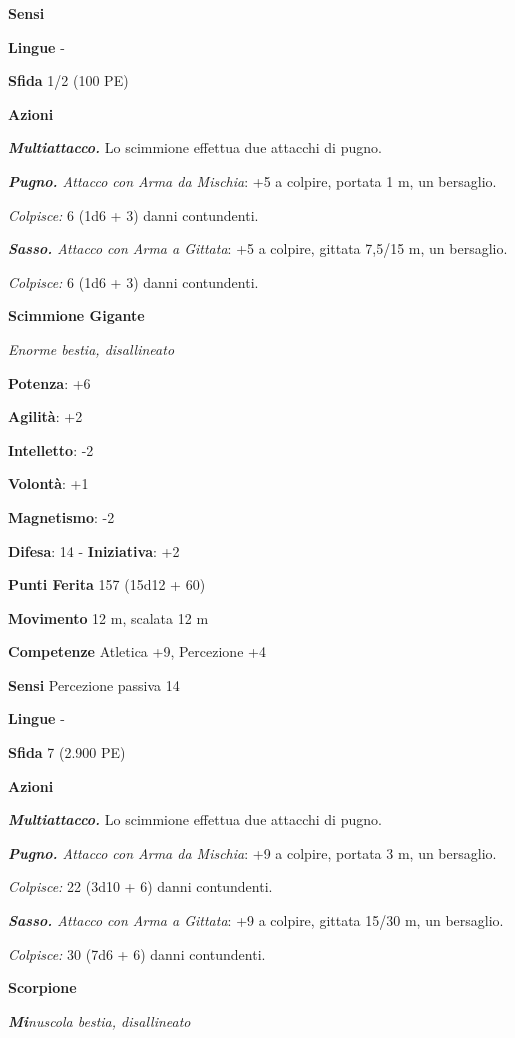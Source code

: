 \begin{multicols}{2}
\textbf{Sensi} 

\textbf{Lingue} -

\textbf{Sfida} 1/2 (100 PE)\smallskip

\smallskip\textbf{Azioni}

\emph{\textbf{Multiattacco.}} Lo scimmione effettua due attacchi di
pugno.

\emph{\textbf{Pugno.} Attacco con Arma da Mischia}: +5 a colpire,
portata 1 m, un bersaglio.

\emph{Colpisce:} 6 (1d6 + 3) danni contundenti.

\emph{\textbf{Sasso.} Attacco con Arma a Gittata}: +5 a colpire, gittata
7,5/15 m, un bersaglio.

\emph{Colpisce:} 6 (1d6 + 3) danni contundenti.

\textbf{Scimmione Gigante}

\emph{Enorme bestia, disallineato}

\textbf{Potenza}: +6

\textbf{Agilità}: +2

\textbf{Intelletto}: -2

\textbf{Volontà}: +1

\textbf{Magnetismo}: -2

\textbf{Difesa}: 14 - \textbf{Iniziativa}: +2

\textbf{Punti Ferita} 157 (15d12 + 60)

\textbf{Movimento} 12 m, scalata 12 m

\textbf{Competenze} Atletica +9, Percezione +4

\textbf{Sensi} Percezione passiva 14

\textbf{Lingue} -

\textbf{Sfida} 7 (2.900 PE)\smallskip

\smallskip\textbf{Azioni}

\emph{\textbf{Multiattacco.}} Lo scimmione effettua due attacchi di
pugno.

\emph{\textbf{Pugno.} Attacco con Arma da Mischia}: +9 a colpire,
portata 3 m, un bersaglio.

\emph{Colpisce:} 22 (3d10 + 6) danni contundenti.

\emph{\textbf{Sasso.} Attacco con Arma a Gittata}: +9 a colpire, gittata
15/30 m, un bersaglio.

\emph{Colpisce:} 30 (7d6 + 6) danni contundenti.

\textbf{Scorpione}

\emph{\textbf{Mi}nuscola bestia, disallineato}


\end{multicols}
